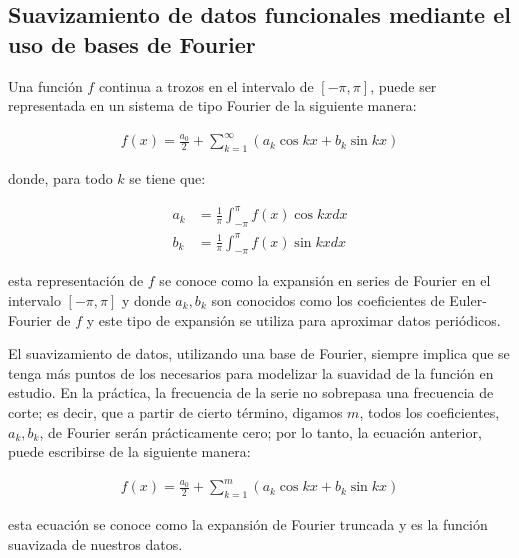 \documentclass[
]{book}
\begin{document}
\hypertarget{suavizamiento-de-datos-funcionales-mediante-el-uso-de-bases-de-fourier}{%
\subsection*{Suavizamiento de datos funcionales mediante el uso de bases de Fourier}\label{suavizamiento-de-datos-funcionales-mediante-el-uso-de-bases-de-fourier}}

Una función \(f\) continua a trozos en el intervalo de \([-\pi,\pi]\), puede ser representada en un sistema de tipo Fourier de la siguiente manera:

\begin{align*}
    f(x)=\frac{a_0}{2}+\sum_{k=1}^\infty(a_k\cos{kx}+b_k\sin{kx})
\end{align*}

donde, para todo \(k\) se tiene que:

\begin{align*}
    a_k&=\frac{1}{\pi}\int_{-\pi}^\pi f(x)\cos{kx}dx\\
    b_k&=\frac{1}{\pi}\int_{-\pi}^\pi f(x) \sin{kx}dx
\end{align*}

esta representación de \(f\) se conoce como la expansión en series de Fourier en el intervalo \([-\pi,\pi]\) y donde \(a_k,b_k\) son conocidos como los coeficientes de Euler-Fourier de \(f\) \citep{kreider} y este tipo de expansión se utiliza para aproximar datos periódicos.

El suavizamiento de datos, utilizando una base de Fourier, siempre implica que se tenga más puntos de los necesarios para modelizar la suavidad de la función en estudio. En la práctica, la frecuencia de la serie no sobrepasa una frecuencia de corte; es decir, que a partir de cierto término, digamos \(m\), todos los coeficientes, \(a_k, b_k\), de Fourier serán prácticamente cero; por lo tanto, la ecuación anterior, puede escribirse de la siguiente manera:

\begin{align*}
     f(x)=\frac{a_0}{2}+\sum_{k=1}^m(a_k\cos{kx}+b_k\sin{kx})
\end{align*}

esta ecuación se conoce como la expansión de Fourier truncada y es la función suavizada de nuestros datos.
\end{document}
